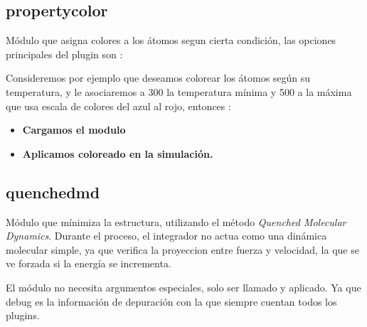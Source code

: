 

\subsection{propertycolor}
M\'odulo que asigna colores a los \'atomos segun cierta condici\'on, las
opciones principales del plugin son :


Consideremos por ejemplo que deseamos colorear los \'atomos seg\'un su
temperatura, y le asociaremos a 300 la temperatura m\'inima y 500 a la m\'axima
que usa escala de colores del azul al rojo, entonces :

\begin{itemize}
 \item \textbf{Cargamos el modulo}
 \item \textbf{Aplicamos coloreado en la simulaci\'on.}
\end{itemize}

\subsection{quenchedmd}
M\'odulo que m\'inimiza la estructura, utilizando el m\'etodo \textit{Quenched
Molecular Dynamics}. Durante el proceso, el integrador no actua como una
din\'amica molecular simple, ya que verifica la proyeccion entre fuerza y
velocidad, la que se ve forzada si la energ\'ia se incrementa.

El m\'odulo no necesita argumentos especiales, solo ser llamado y aplicado. Ya
que debug es la informaci\'on de depuraci\'on con la que siempre cuentan todos
los plugins.

